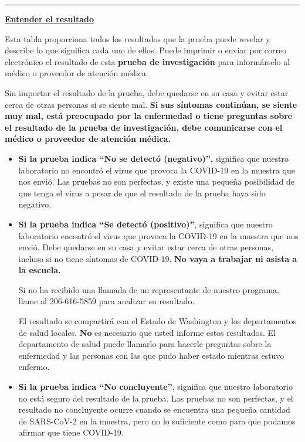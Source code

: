 \documentclass[10pt]{article}
\newcommand{\PageLine}{\rule{\textwidth}{0.25mm}}
\begin{document}
\PageLine
\bigskip

\large \underline{\textbf{Entender el resultado}}

Esta tabla proporciona todos los resultados que la prueba puede revelar y
describe lo que significa cada uno de ellos. Puede imprimir o enviar por correo
electrónico el resultado de esta \textbf{prueba de investigación} para
informárselo al médico o proveedor de atención médica.

Sin importar el resultado de la prueba, debe quedarse en su casa y evitar estar
cerca de otras personas si se siente mal. \textbf{Si sus síntomas continúan, se
siente muy mal, está preocupado por la enfermedad o tiene preguntas sobre el
resultado de la prueba de investigación, debe comunicarse con el médico o
proveedor de atención médica.}

\begin{itemize}


\item

  \textbf{Si la prueba indica ``No se detectó (negativo)''}, significa que nuestro
  laboratorio no encontró el virus que provoca la COVID-19 en la muestra que nos
  envió. Las pruebas no son perfectas, y existe una pequeña posibilidad de que
  tenga el virus a pesar de que el resultado de la prueba haya sido negativo.


\item

  \textbf{Si la prueba indica ``Se detectó (positivo)''}, significa que nuestro
  laboratorio encontró el virus que provoca la COVID-19 en la muestra que nos
  envió. Debe quedarse en su casa y evitar estar cerca de otras personas,
  incluso si no tiene síntomas de COVID-19. \textbf{No vaya a trabajar ni asista
  a la escuela.}

  Si no ha recibido una llamada de un representante de nuestro programa, llame
  al 206-616-5859 para analizar su resultado.

  El resultado se compartirá con el Estado de Washington y los departamentos de
  salud locales. \textbf{No} es necesario que usted informe estos resultados. El
  departamento de salud puede llamarlo para hacerle preguntas sobre la
  enfermedad y las personas con las que pudo haber estado mientras estuvo
  enfermo.


\item

  \textbf{Si la prueba indica ``No concluyente''}, significa que nuestro
  laboratorio no está seguro del resultado de la prueba. Las pruebas no son
  perfectas, y el resultado no concluyente ocurre cuando se encuentra una
  pequeña cantidad de SARS-CoV-2 en la muestra, pero no lo suficiente como para
  que podamos afirmar que tiene COVID-19.


\end{itemize}
\end{document}

